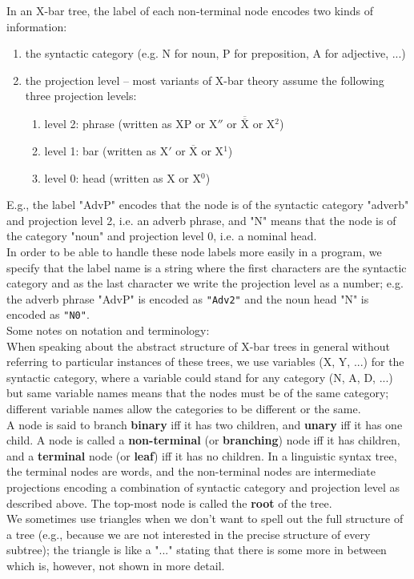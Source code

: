 In an X-bar tree, the label of each non-terminal node encodes two kinds of information:\\[-1.25\baselineskip]
\begin{enumerate}[label=\textbullet]\itemsep-.5ex
	\item the syntactic category (e.g. N for noun, P for preposition, A for adjective, ...)
	\item the projection level -- most variants of X-bar theory assume the following three projection levels:\\[-1.5\baselineskip]
	\begin{enumerate}[label={--}]\itemsep0pt
		\item level 2: phrase (written as XP or X$''$ or $\overline{\overline{\mbox{X}}}$ or X$^2$)
		\item level 1: bar (written as X$'$ or $\overline{\mbox{X}}$ or X$^1$)
		\item level 0: head (written as X or X$^0$)
	\end{enumerate}
\end{enumerate}
E.g., the label "AdvP" encodes that the node is of the syntactic category "adverb" and projection level 2, i.e. an adverb phrase, and "N" means that the node is of the category "noun" and projection level 0, i.e. a nominal head.\\
In order to be able to handle these node labels more easily in a program, we specify that the label name is a string where the first characters are the syntactic category and as the last character we write the projection level as a number; e.g. the adverb phrase "AdvP" is encoded as \texttt{"Adv2"} and the noun head "N" is encoded as \texttt{"N0"}.\\

Some notes on notation and terminology:\\
When speaking about the abstract structure of X-bar trees in general without referring to particular instances of these trees, we use variables (X, Y, ...) for the syntactic category, where a variable could stand for any category (N, A, D, ...) but same variable names means that the nodes must be of the same category; different variable names allow the categories to be different or the same.\\
A node is said to branch \textbf{binary} iff it has two children, and \textbf{unary} iff it has one child. A node is called a \textbf{non-terminal} (or \textbf{branching}) node iff it has children, and a \textbf{terminal} node (or \textbf{leaf}) iff it has no children. In a linguistic syntax tree, the terminal nodes are words, and the non-terminal nodes are intermediate projections encoding a combination of syntactic category and projection level as described above. The top-most node is called the \textbf{root} of the tree.\\
We sometimes use triangles when we don't want to spell out the full structure of a tree (e.g., because we are not interested in the precise structure of every subtree); the triangle is like a "..." stating that there is some more in between which is, however, not shown in more detail.

